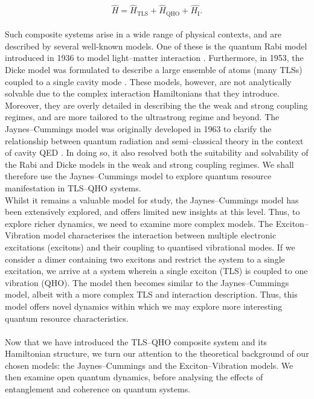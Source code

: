 \documentclass[11pt]{article}
\begin{document}
\begin{equation}
    \hat{H} = \hat{H}_{\scriptscriptstyle \text{TLS}} + \hat{H}_{\scriptscriptstyle \text{QHO}} + \hat{H_{\scriptscriptstyle \text{I}}}.
\end{equation}
\\
Such composite systems arise in a wide range of physical contexts, and are described by several well-known models. One of these is the quantum Rabi model introduced in 1936 to model light--matter interaction \cite{Context1936-Rabi}. Furthermore, in 1953, the Dicke model was formulated to describe a large ensemble of atoms (many TLSs) coupled to a single cavity mode \cite{Context1954-Dicke}. These models, however, are not analytically solvable due to the complex interaction Hamiltonians that they introduce. Moreover, they are overly detailed in describing the the weak and strong coupling regimes, and are more tailored to the ultrastrong regime and beyond. The Jaynes--Cummings model was originally developed in 1963 to clarify the relationship between quantum radiation and semi--classical theory in the context of cavity QED \cite{Context1963-JC_Original}. In doing so, it also resolved both the suitability and solvability of the Rabi and Dicke models in the weak and strong coupling regimes. We shall therefore use the Jaynes--Cummings model to explore quantum resource manifestation in TLS--QHO systems.\\
Whilst it remains a valuable model for study, the Jaynes--Cummings model has been extensively explored, and offers limited new insights at this level. Thus, to explore richer dynamics, we need to examine more complex models. The Exciton--Vibration model characterises the interaction between multiple electronic excitations (excitons) and their coupling to quantised vibrational modes. If we consider a dimer containing two excitons and restrict the system to a single excitation, we arrive at a system wherein a single exciton (TLS) is coupled to one vibration (QHO). The model then becomes similar to the Jaynes--Cummings model, albeit with a more complex TLS and interaction description. Thus, this model offers novel dynamics within which we may explore more interesting quantum resource characteristics. \\
\\
Now that we have introduced the TLS–QHO composite system and its Hamiltonian structure, we turn our attention to the theoretical background of our chosen models: the Jaynes–Cummings and the Exciton–Vibration models. We then examine open quantum dynamics, before analysing the effects of entanglement and coherence on quantum systems.
\end{document}
